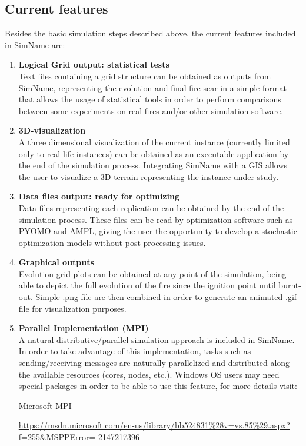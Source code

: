 \documentclass[11pt]{article}
\begin{document}
\subsection{Current features}
Besides the basic simulation steps described above, the current features included in SimName are:
\begin{enumerate}
	\item \textbf{Logical Grid output: statistical tests}\\
		Text files containing a grid structure can be obtained as outputs from SimName, representing the evolution and final fire scar in a simple format that allows the usage of statistical tools in order to perform comparisons between some experiments on real fires and/or other simulation software. 
	
	\item \textbf{3D-visualization}\\
		A three dimensional visualization of the current instance (currently limited only to real life instances) can be obtained as an executable application by the end of the simulation process. Integrating SimName with a GIS allows the user to visualize a 3D terrain representing the instance under study. 
		
	\item \textbf{Data files output: ready for optimizing}\\
		Data files representing each replication can be obtained by the end of the simulation process. These files can be read by optimization software such as PYOMO and AMPL, giving the user the opportunity to develop a stochastic optimization models without post-processing issues. 
		
	\item \textbf{Graphical outputs}\\
		Evolution grid plots can be obtained at any point of the simulation, being able to depict the full evolution of the fire since the ignition point until burnt-out. Simple .png file are then combined in order to generate an animated .gif file for visualization purposes.

	\item \textbf{Parallel Implementation (MPI)}\\
	  A natural distributive/parallel simulation approach is included in SimName. In order to take advantage of this implementation, tasks such as sending/receiving messages are naturally parallelized and distributed along the available resources (cores, nodes, etc.). Windows OS users may need special packages in order to be able to use this feature, for more details visit:

          \href{https://msdn.microsoft.com/en-us/library/bb524831%28v=vs.85%29.aspx?f=255&MSPPError=-2147217396}{Microsoft MPI}
            
                      \url{https://msdn.microsoft.com/en-us/library/bb524831%28v=vs.85%29.aspx?f=255&MSPPError=-2147217396}
\end{enumerate}
\end{document}
